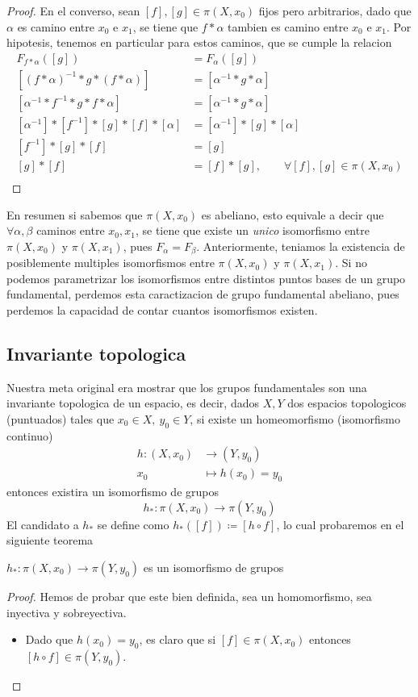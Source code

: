 {\begin{proof}
  En el converso, sean \([f],[g] \in \pi (X, x_0) \) fijos pero
  arbitrarios, dado que \(\alpha\) es camino entre \(x_0\) e \(x_1\), se
  tiene que \(f * \alpha\) tambien es camino entre \(x_0\) e \(x_1\).
Por hipotesis, tenemos en particular para estos caminos, que se cumple
la relacion
  \begin{align*}
    F_{f * \alpha} ([g]) &= F_{\alpha} ([g]) \\
    [(f * \alpha)^{-1} * g * (f * \alpha) ] &= [\alpha^{-1} * g * \alpha] \\
    [\alpha^{-1} * f^{-1} * g * f * \alpha ] &= [\alpha^{-1} * g * \alpha] \\
    [\alpha^{-1}] * [f^{-1}] * [g] * [f] * [\alpha] &= [\alpha^{-1}] *
        [g] * [\alpha] \\
    [f^{-1}] * [g] * [f] &= [g] \\
    [g] * [f] &= [f] * [g], \qquad \forall [f],[g] \in \pi (X, x_0) \\
  \end{align*}
\end{proof}
En resumen si sabemos que \(\pi (X, x_0)\) es abeliano, esto equivale a
decir que \(\forall \alpha,\beta\) caminos entre \(x_0, x_1\), se tiene
que existe un \emph{unico} isomorfismo entre \(\pi (X,x_0) \) y \( \pi
(X,x_1)\), pues \(F_\alpha = F_\beta\). Anteriormente, teniamos la
existencia de posiblemente multiples isomorfismos entre \(\pi (X, x_0)
\) y \(\pi (X, x_1) \). Si no podemos parametrizar los isomorfismos
entre distintos puntos bases de un grupo fundamental, perdemos esta
caractizacion de grupo fundamental abeliano, pues perdemos la capacidad
de contar cuantos isomorfismos existen.

\subsection{Invariante topologica}
Nuestra meta original era mostrar que los grupos fundamentales son una
invariante topologica de un espacio, es decir, dados \(X,Y\) dos
espacios topologicos (puntuados) tales que \(x_0 \in X,\ y_0 \in Y\), si
existe un homeomorfismo (isomorfismo continuo)
\begin{align*}
  h : (X, x_0) &\to (Y, y_0) \\
  x_0 &\mapsto h(x_0) = y_0
\end{align*}
entonces existira un isomorfismo de grupos
\[ h_{*} : \pi (X, x_0) \to \pi (Y, y_0) \]
El candidato a \(h_{*}\) se define como \(h_{*} ([f]) \coloneqq [h \circ
f] \), lo cual probaremos en el siguiente teorema
\begin{teorema}
\(h_{*} : \pi (X, x_0) \to \pi (Y, y_0)\) es un isomorfismo de grupos
\end{teorema}
\begin{proof}
  Hemos de probar que este bien definida, sea un homomorfismo, sea
  inyectiva y sobreyectiva.
  \begin{itemize}
  \item Dado que \(h(x_0) = y_0\), es
    claro que si \([f] \in \pi (X, x_0) \) entonces \( [h \circ f] \in
    \pi (Y, y_0)\).


\end{itemize}
\end{proof}}
